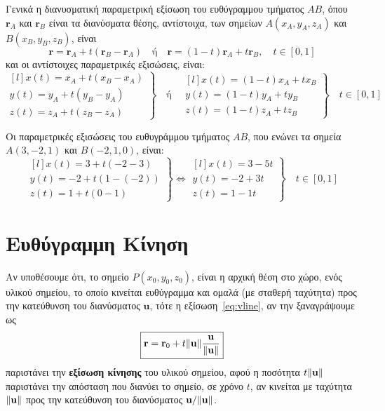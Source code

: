 Γενικά η διανυσματική παραμετρική εξίσωση του \textcolor{Col1}{ευθύγραμμου τμήματος} 
$ AB $, όπου $ \mathbf{r}_{A} $ και $ \mathbf{r}_{B} $ είναι τα διανύσματα θέσης, 
αντίστοιχα, των σημείων $ A(x_{A},y_{A},z_{A}) $ και $B(x_{B},y_{B},z_{B})$, είναι 
\[
  \boxed{\mathbf{r} = \mathbf{r}_{A} + t(\mathbf{r}_{B}- \mathbf{r}_{A})} 
  \quad \text{ή} \quad \boxed{\mathbf{r} = (1-t) \mathbf{r}_{A} + t \mathbf{r}_{B}}, 
  \quad t \in [0,1]
\] 
και οι αντίστοιχες παραμετρικές εξισώσεις, είναι:
\[
  \boxed{\left.
      \begin{matrix*}[l]
        x(t) = x_{A} + t(x_{B}-x_{A}) \\
        y(t) = y_{A} + t(y_{B}-y_{A}) \\
        z(t) = z_{A} + t(z_{B}-z_{A}) 
      \end{matrix*} 
  \right\}} \quad \text{ή} \quad  
  \boxed{\left.
      \begin{matrix*}[l]
        x(t) = (1-t)x_{A} + tx_{B} \\
        y(t) = (1-t)y_{A} + ty_{B} \\
        z(t) = (1-t)z_{A} + tz_{B} 
      \end{matrix*} 
  \right\}} \quad t \in [0,1]
\]

\begin{example}
  Οι παραμετρικές εξισώσεις του ευθυγράμμου τμήματος $ AB $, που ενώνει τα σημεία 
  $ A(3,-2,1) $ και $ B(-2,1,0) $, είναι:
  \[
    \left.
      \begin{matrix*}[l]
        x(t) = 3+t(-2-3) \\
        y(t) = -2+t(1-(-2)) \\
        z(t) = 1+t(0-1)
      \end{matrix*} 
    \right\} \Leftrightarrow 
    \left.
      \begin{matrix*}[l]
        x(t) = 3-5t \\
        y(t) = -2+3t \\
        z(t) = 1-1t
      \end{matrix*} 
    \right\} \quad t \in [0,1]
  \] 
\end{example}


\section*{Ευθύγραμμη Κίνηση}

Αν υποθέσουμε ότι, το σημείο $ P(x_{0}, y_{0}, z_{0}) $, είναι η αρχική θέση στο 
χώρο, ενός υλικού σημείου, το οποίο κινείται ευθύγραμμα και ομαλά (με σταθερή ταχύτητα) 
προς την κατεύθυνση του διανύσματος $ \mathbf{u} $, τότε η εξίσωση~\eqref{eq:vline}, 
αν την ξαναγράψουμε ως
\[
  \boxed{\mathbf{r} = \mathbf{r}_{0} + t \norm{\mathbf{u}}
  \frac{\mathbf{u}}{\norm{\mathbf{u}}}}
\]
παριστάνει την \textbf{εξίσωση κίνησης} του υλικού σημείου, αφού η ποσότητα 
$ t \norm{\mathbf{u}} $ παριστάνει την απόσταση που διανύει το σημείο, σε χρόνο $t$, 
αν κινείται με ταχύτητα $ \norm{\mathbf{u}} $ προς την κατεύθυνση του διανύσματος 
$ \mathbf{u}/ \norm{\mathbf{u}} $.


